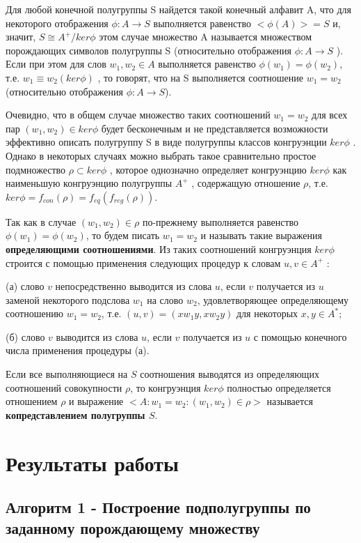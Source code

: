 \documentclass[spec, och, labwork]{shiza}
\begin{document}
Для любой конечной полугруппы S найдется такой конечный алфавит A, что для некоторого отображения
$\phi : A \rightarrow S$ выполняется равенство $<\phi(A)>=S$ и, значит, $S \cong A^+/ ker \phi$ этом случае множество A
называется множеством порождающих символов полугруппы S (относительно отображения $\phi : A \rightarrow S$ ). Если
при этом для слов $w_1,w_2 \in A$ выполняется равенство $\phi(w_1) = \phi(w_2)$, т.е. $w_1 \equiv w_2(ker\phi)$ , то
говорят, что на S выполняется соотношение $w_1 = w_2$ (относительно отображения $\phi : A \rightarrow S$).

Очевидно, что в общем случае множество таких соотношений $w_1 = w_2$ для всех пар $(w_1, w_2) \in ker\phi$ будет бесконечным
и не представляется возможности эффективно описать полугруппу S в виде полугруппы классов конгруэнции $ker\phi$ . Однако в
некоторых случаях можно выбрать такое сравнительно простое подмножество $\rho \subset ker\phi$ , которое однозначно определяет
конгруэнцию $ker\phi$ как наименьшую конгруэнцию полугруппы $A^+$ , содержащую отношение $\rho$, т.е. $ker\phi = f_{con}(\rho) = f_{eq}(f_{reg}(\rho))$.

Так как в случае $(w_1, w_2) \in \rho$ по-прежнему выполняется равенство $\phi(w_1) = \phi(w_2)$, то будем писать
$w_1 = w_2$ и называть такие выражения \textbf{определяющими соотношениями}. Из таких соотношений конгруэнция $ker\phi$ строится
с помощью применения следующих процедур к словам $u,v \in A^+$ :

(а) слово $v$ непосредственно выводится из слова $u$, если $v$ получается из $u$ заменой некоторого подслова $w_1$ на слово
$w_2$, удовлетворяющее определяющему соотношению $w_1 = w_2$, т.е. $(u, v) = (xw_1y, xw_2y)$ для некоторых $x, y \in A^*$;

(б) слово $v$ выводится из слова $u$, если $v$ получается из $u$ с помощью конечного числа применения процедуры (а).

Если все выполняющиеся на $S$ соотношения выводятся из определяющих соотношений совокупности $\rho$, то конгруэнция $ker\phi$
полностью определяется отношением $\rho$ и выражение $<A: {w_1 = w_2 : (w_1, w_2) \in \rho}>$ называется \textbf{копредставлением полугруппы $S$}.

\section{Результаты работы}

    \subsection{Алгоритм 1 - Построение подполугруппы по заданному порождающему множеству}
\end{document}
